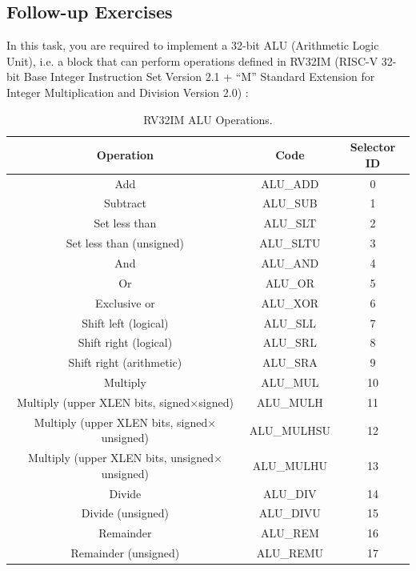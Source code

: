 \documentclass[a4paper,12pt,twoside]{article}
\begin{document}
\subsection{Follow-up Exercises}
In this task, you are required to implement a 32-bit ALU (Arithmetic Logic Unit), i.e. a block that can perform operations defined in RV32IM (RISC-V 32-bit Base Integer Instruction Set Version 2.1 + “M” Standard Extension for Integer Multiplication and Division Version 2.0) \cite{riscv-unpriv}:
\begin{table}[H]
    \centering
    \begin{tabular}{|c|c|c|}
        \hline
        Operation & Code & Selector ID \\
        \hline
        Add & ALU\_ADD & 0 \\
        \hline
        Subtract & ALU\_SUB & 1 \\
        \hline
        Set less than & ALU\_SLT & 2 \\
        \hline
        Set less than (unsigned) & ALU\_SLTU & 3 \\
        \hline
        And & ALU\_AND & 4 \\
        \hline
        Or & ALU\_OR & 5 \\
        \hline
        Exclusive or & ALU\_XOR & 6\\
        \hline
        Shift left (logical) & ALU\_SLL & 7 \\
        \hline
        Shift right (logical) & ALU\_SRL & 8 \\
        \hline
        Shift right (arithmetic) & ALU\_SRA & 9 \\
        \hline
        Multiply & ALU\_MUL & 10 \\
        \hline
        Multiply (upper XLEN bits, signed$\times$signed) & ALU\_MULH & 11 \\
        \hline
        Multiply (upper XLEN bits, signed$\times$unsigned) & ALU\_MULHSU & 12 \\
        \hline
        Multiply (upper XLEN bits, unsigned$\times$unsigned) & ALU\_MULHU & 13 \\
        \hline
        Divide & ALU\_DIV & 14 \\
        \hline
        Divide (unsigned) & ALU\_DIVU & 15 \\
        \hline
        Remainder & ALU\_REM & 16 \\
        \hline
        Remainder (unsigned) & ALU\_REMU & 17\\
        \hline
    \end{tabular}
    \caption{RV32IM ALU Operations.}
\end{table}
\end{document}
